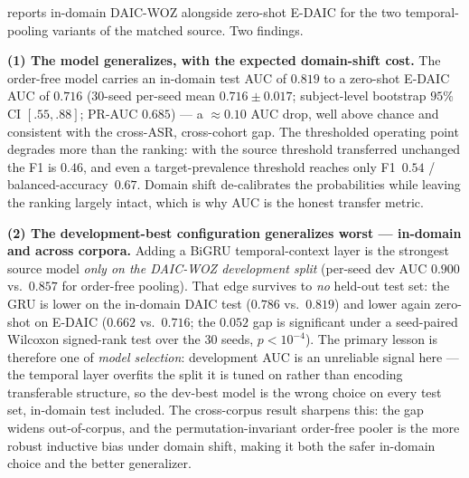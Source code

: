 \documentclass[conference]{IEEEtran}
\begin{document}
 reports in-domain DAIC-WOZ alongside zero-shot E-DAIC for the two
temporal-pooling variants of the matched source. Two findings.

\textbf{(1) The model generalizes, with the expected domain-shift cost.} The
order-free model carries an in-domain test AUC of $0.819$ to a zero-shot E-DAIC
AUC of $0.716$ (30-seed per-seed mean $0.716\pm0.017$; subject-level bootstrap
$95\%$ CI $[.55,.88]$; PR-AUC $0.685$) --- a $\approx\!0.10$ AUC drop, well above
chance and consistent with the cross-ASR, cross-cohort gap. The thresholded operating point degrades more
than the ranking: with the source threshold transferred unchanged the F1 is
$0.46$, and even a target-prevalence threshold reaches only F1~$0.54$ /
balanced-accuracy~$0.67$. Domain shift de-calibrates the probabilities while
leaving the ranking largely intact, which is why AUC is the honest transfer
metric.

\textbf{(2) The development-best configuration generalizes worst --- in-domain
and across corpora.} Adding a BiGRU temporal-context layer is the strongest
source model \emph{only on the DAIC-WOZ development split} (per-seed dev AUC
$0.900$ vs.\ $0.857$ for order-free pooling). That edge survives to \emph{no}
held-out test set: the GRU is lower on the in-domain DAIC test ($0.786$ vs.\
$0.819$) and lower again zero-shot on E-DAIC ($0.662$ vs.\ $0.716$; the $0.052$
gap is significant under a seed-paired Wilcoxon signed-rank test over the 30
seeds, $p<10^{-4}$). The primary lesson is therefore one of \emph{model
selection}: development AUC is an unreliable signal here --- the temporal layer
overfits the split it is tuned on rather than encoding transferable structure,
so the dev-best model is the wrong choice on every test set, in-domain test
included. The cross-corpus result sharpens this: the gap widens out-of-corpus,
and the permutation-invariant order-free pooler is the more robust inductive
bias under domain shift, making it both the safer in-domain choice and the
better generalizer.
\end{document}
